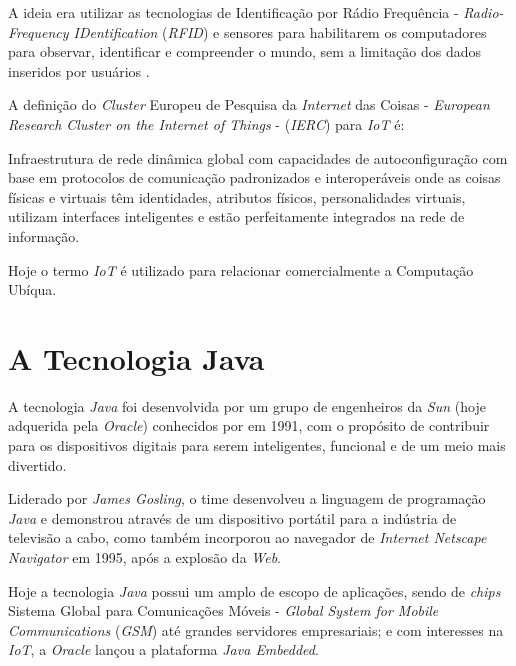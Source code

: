 A ideia era utilizar as tecnologias de Identificação por Rádio Frequência -
\textit{Radio-Frequency IDentification} (\textit{RFID}) e sensores para
habilitarem os computadores para observar, identificar e compreender o mundo,
sem a limitação dos dados inseridos por usuários \cite{kevinashton2009}.

\newpage
A definição do \textit{Cluster} Europeu de Pesquisa da \textit{Internet} das
Coisas - \textit{European Research Cluster on the Internet of Things} -
(\textit{IERC}) \cite[p. ~26]{iangsmith2012} para \textit{IoT} é:

\begin{citacao}
    Infraestrutura de rede dinâmica global com capacidades de autoconfiguração
    com base em protocolos de comunicação padronizados e interoperáveis onde as
    coisas físicas e virtuais têm identidades, atributos físicos,
    personalidades virtuais, utilizam interfaces inteligentes e estão
    perfeitamente integrados na rede de informação.
\end{citacao}

Hoje o termo \textit{IoT} é utilizado para relacionar comercialmente a
Computação Ubíqua.

\section{A Tecnologia Java}

A tecnologia \textit{Java} foi desenvolvida por um grupo de engenheiros da
\textit{Sun} (hoje adquerida pela \textit{Oracle}) conhecidos por
 em 1991, com o propósito de contribuir para os
dispositivos digitais para serem inteligentes, funcional e de um meio mais
divertido.

Liderado por \textit{James Gosling}, o time desenvolveu a linguagem de
programação \textit{Java} e demonstrou através de um dispositivo portátil para
a indústria de televisão a cabo, como também incorporou ao navegador de
\textit{Internet Netscape Navigator} em 1995, após a explosão da \textit{Web}.

Hoje a tecnologia \textit{Java} possui um amplo de escopo de aplicações, sendo
de \textit{chips} Sistema Global para Comunicações Móveis - \textit{Global
    System for Mobile Communications} (\textit{GSM}) até grandes servidores
empresariais; e com interesses na \textit{IoT}, a \textit{Oracle} lançou a
plataforma \textit{Java Embedded}.
